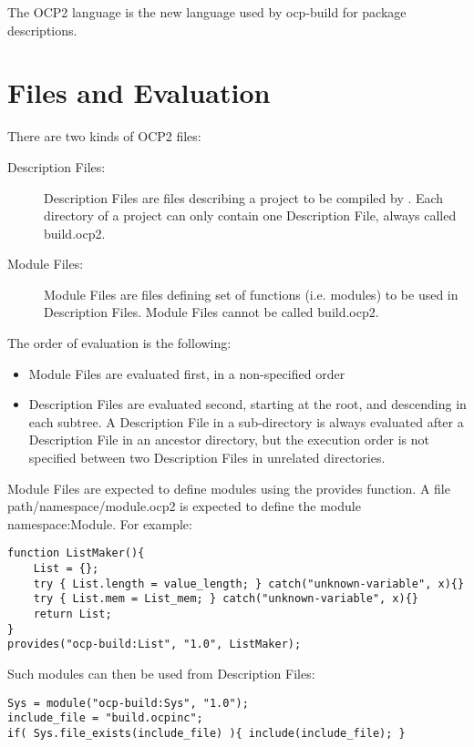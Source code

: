 

The OCP2 language is the new language used by ocp-build for package
descriptions.

\section{Files and Evaluation}

There are two kinds of OCP2 files:
\begin{description}
\item[Description Files:] Description Files are files describing a
  project to be compiled by \ocpbuild{}. Each directory of a project
  can only contain one Description File, always called {\sf
    build.ocp2}.
\item[Module Files:] Module Files are files defining set of functions
  (i.e. modules) to be used in Description Files. Module Files cannot
  be called {\sf build.ocp2}.
\end{description}

The order of evaluation is the following:
\begin{itemize}
\item Module Files are evaluated first, in a non-specified order
\item Description Files are evaluated second, starting at the root,
  and descending in each subtree. A Description File in a
  sub-directory is always evaluated after a Description File in an
  ancestor directory, but the execution order is not specified between
  two Description Files in unrelated directories.
\end{itemize}

Module Files are expected to define modules using the {\sf provides}
function. A file {\sf path/namespace/module.ocp2} is expected to define
the module {\sf namespace:Module}. For example:

\begin{lstlisting}[language=ocp2]
function ListMaker(){
    List = {};
    try { List.length = value_length; } catch("unknown-variable", x){}
    try { List.mem = List_mem; } catch("unknown-variable", x){}
    return List;
}
provides("ocp-build:List", "1.0", ListMaker);
\end{lstlisting}

Such modules can then be used from Description Files:

\begin{lstlisting}[language=ocp2]
Sys = module("ocp-build:Sys", "1.0");
include_file = "build.ocpinc";
if( Sys.file_exists(include_file) ){ include(include_file); }
\end{lstlisting}

